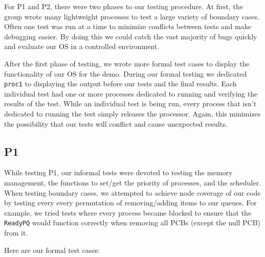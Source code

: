 \documentclass[12pt]{report}
\begin{document}
For P1 and P2, there were two phases to our testing procedure.  At first, the group wrote many lightweight processes to test a large variety of boundary cases.  Often one test was run at a time to minimize conflicts between tests and make debugging easier.  By doing this we could catch the vast majority of bugs quickly and evaluate our OS in a controlled environment.

After the first phase of testing, we wrote more formal test cases to display the functionality of our OS for the demo.  During our formal testing we dedicated \texttt{proc1} to displaying the output before our tests and the final results. Each individual test had one or more processes dedicated to running and verifying the results of the test.  While an individual test is being run, every process that isn't dedicated to running the test simply releases the processor.  Again, this minimizes the possibility that our tests will conflict and cause unexpected results.

\subsection{P1}

While testing P1, our informal tests were devoted to testing the memory management, the functions to set/get the priority of processes, and the scheduler.  When testing boundary cases, we attempted to achieve node coverage of our code by testing every every permutation of removing/adding items to our queues.  For example, we tried tests where every process became blocked to ensure that the \texttt{ReadyPQ} would function correctly when removing all PCBs (except the null PCB) from it.

Here are our formal test cases:
\end{document}
